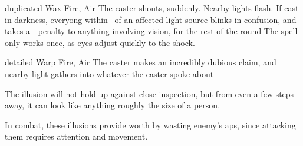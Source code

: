   {duplicated}%
  {Wax}%
  {Fire, Air}%
  {}%
  {The caster shouts, suddenly.
  Nearby lights flash.
  If cast in darkness, everyong within \spellRange\ of an affected light source blinks in confusion, and takes a - penalty to anything involving vision, for the rest of the round}%
  {The spell only works once, as eyes adjust quickly to the shock.}

  {detailed}%
  {Warp}%
  {Fire, Air}%
  {}%
  {The caster makes an incredibly dubious claim, and nearby light gathers into whatever the caster spoke about}%
  {The illusion will not hold up against close inspection, but from even a few steps away, it can look like anything roughly the size of a person.

  In combat, these illusions provide worth by wasting enemy's \glspl{ap}, since attacking them requires attention and movement.}

